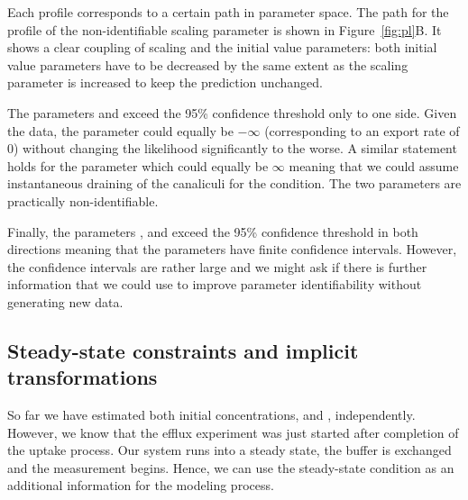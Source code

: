 \documentclass[article]{jss}
\begin{document}
Each profile corresponds to a certain path in parameter space. The path for the profile of the non-identifiable scaling parameter  is shown in Figure~\ref{fig:pl}B. It shows a clear coupling of scaling and the initial value parameters: both initial value parameters have to be decreased by the same extent as the scaling parameter is increased to keep the prediction unchanged.

The parameters  and  exceed the 95\% confidence threshold only to one side. Given the data, the  parameter could equally be $-\infty$ (corresponding to an export rate of 0) without changing the likelihood significantly to the worse. A similar statement holds for the  parameter which could equally be $\infty$ meaning that we could assume instantaneous draining of the canaliculi for the  condition. The two parameters are practically non-identifiable.

Finally, the parameters ,  and  exceed the 95\% confidence threshold in both directions meaning that the parameters have finite confidence intervals. However, the confidence intervals are rather large and we might ask if there is further information that we could use to improve parameter identifiability without generating new data.

\subsection{Steady-state constraints and implicit transformations}

So far we have estimated both initial concentrations,  and , independently. However, we know that the efflux experiment was just started after completion of the uptake process. Our system runs into a steady state, the buffer is exchanged and the measurement begins. Hence, we can use the steady-state condition as an additional information for the modeling process.
\end{document}
